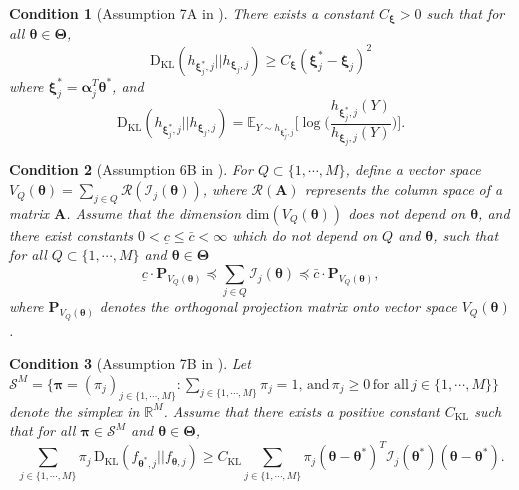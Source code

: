 \documentclass[12pt]{article}
\newcommand{\bfTheta}{\boldsymbol{\Theta}}
\newcommand{\bfalpha}{\boldsymbol{\alpha}}
\newcommand{\bfpi}{\boldsymbol{\pi}}
\newcommand{\bftheta}{\boldsymbol{\theta}}
\newcommand{\bfxi}{\boldsymbol{\xi}}
\newtheorem{condition}{Condition}[section]
\begin{document}
\begin{condition}[Assumption 7A in ] \label{c:c7a}
There exists a constant $C_{\bfxi} > 0$ such that for all $\bftheta \in \bfTheta$, 
\begin{equation*}
\mathrm{D}_{\mathrm{KL}}(h_{\bfxi_j^{\ast}, j} || h_{\bfxi_j, j}) \geq C_{\bfxi} ( \bfxi_j^{\ast} - \bfxi_j )^2
\end{equation*}
where $\bfxi_j^{\ast} = \bfalpha_j^T \bftheta^{\ast}$, and 
\begin{equation*}
\mathrm{D}_{\mathrm{KL}}( h_{\bfxi_j^{\ast}, j} || h_{\bfxi_j, j}) = \mathbb{E}_{Y \sim h_{\bfxi_j^{\ast}, j}} \Big[ \log \Big( \frac{h_{\bfxi_j^{\ast},j}(Y)}{h_{\bfxi_j, j}(Y)} \Big) \Big].
\end{equation*}
\end{condition}

\begin{condition}[Assumption 6B in ] \label{c:c6b}
For $Q \subset \{1,\cdots,M\}$, define a vector space $V_Q(\bftheta) =  \sum_{j \in Q} \mathcal{R}( \mathcal{I}_j(\bftheta))$, where $\mathcal{R}(\mathbf{A})$ represents the column space of a matrix $\mathbf{A}$. Assume that the dimension $\mathrm{dim}(V_Q(\bftheta))$ does not depend on $\bftheta$, and there exist constants $0 < \underline{c} \leq \bar{c} < \infty$ which do not depend on $Q$ and $\bftheta$, such that for all $Q \subset \{1,\cdots,M\}$ and $\bftheta \in \bfTheta$
\begin{equation*}
\underline{c} \cdot \mathbf{P}_{V_{Q}(\bftheta)} \preceq \sum_{j \in Q} \mathcal{I}_j(\bftheta) \preceq \bar{c} \cdot \mathbf{P}_{V_Q(\bftheta)},
\end{equation*}
where $\mathbf{P}_{V_Q(\bftheta)}$ denotes the orthogonal projection matrix onto vector space $V_Q(\bftheta)$.
\end{condition}


\begin{condition}[Assumption 7B in ] \label{c:c7b}
Let $\mathcal{S}^M = \{ \bfpi = (\pi_j)_{j \in \{1,\cdots,M\}} : \sum_{j \in \{1,\cdots,M\}} \pi_j = 1, \, \text{and} \, \pi_j \geq 0 \, \text{for all} \, j \in \{1,\cdots,M\} \}$ denote the simplex in $\mathbb{R}^M$. Assume that there exists a positive constant $C_{\mathrm{KL}}$ such that for all $\bfpi \in \mathcal{S}^M$ and $\bftheta \in \bfTheta$, 
\begin{equation*}
\sum_{j \in \{1,\cdots,M\}} \pi_j \, \mathrm{D}_{\mathrm{KL}}( f_{\bftheta^{\ast},j} || f_{\bftheta, j} ) 
\geq {C}_{\mathrm{KL}} \sum_{j \in \{1, \cdots, M \} } \pi_j (\bftheta - \bftheta^{\ast})^T \mathcal{I}_{j}(\bftheta^{\ast}) (\bftheta - \bftheta^{\ast}).
\end{equation*}
\end{condition}
\end{document}
